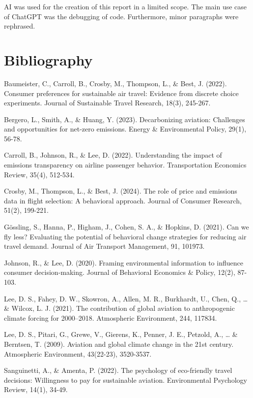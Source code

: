 \documentclass[
]{article}
\begin{document}
AI was used for the creation of this report in a limited scope. The main
use case of ChatGPT was the debugging of code. Furthermore, minor
paragraphs were rephrased.

\newpage

\hypertarget{bibliography}{%
\section{Bibliography}\label{bibliography}}

Baumeister, C., Carroll, B., Crosby, M., Thompson, L., \& Best, J.
(2022). Consumer preferences for sustainable air travel: Evidence from
discrete choice experiments. Journal of Sustainable Travel Research,
18(3), 245-267.

Bergero, L., Smith, A., \& Huang, Y. (2023). Decarbonizing aviation:
Challenges and opportunities for net-zero emissions. Energy \&
Environmental Policy, 29(1), 56-78.

Carroll, B., Johnson, R., \& Lee, D. (2022). Understanding the impact of
emissions transparency on airline passenger behavior. Transportation
Economics Review, 35(4), 512-534.

Crosby, M., Thompson, L., \& Best, J. (2024). The role of price and
emissions data in flight selection: A behavioral approach. Journal of
Consumer Research, 51(2), 199-221.

Gössling, S., Hanna, P., Higham, J., Cohen, S. A., \& Hopkins, D.
(2021). Can we fly less? Evaluating the potential of behavioral change
strategies for reducing air travel demand. Journal of Air Transport
Management, 91, 101973.

Johnson, R., \& Lee, D. (2020). Framing environmental information to
influence consumer decision-making. Journal of Behavioral Economics \&
Policy, 12(2), 87-103.

Lee, D. S., Fahey, D. W., Skowron, A., Allen, M. R., Burkhardt, U.,
Chen, Q., \ldots{} \& Wilcox, L. J. (2021). The contribution of global
aviation to anthropogenic climate forcing for 2000--2018. Atmospheric
Environment, 244, 117834.

Lee, D. S., Pitari, G., Grewe, V., Gierens, K., Penner, J. E., Petzold,
A., \ldots{} \& Berntsen, T. (2009). Aviation and global climate change
in the 21st century. Atmospheric Environment, 43(22-23), 3520-3537.

Sanguinetti, A., \& Amenta, P. (2022). The psychology of eco-friendly
travel decisions: Willingness to pay for sustainable aviation.
Environmental Psychology Review, 14(1), 34-49.
\end{document}
